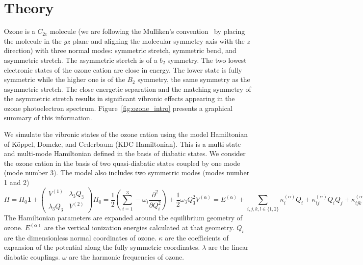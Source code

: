 \documentclass[12pt,a4paper,prb,aps,superscriptaddress]{revtex4}
\begin{document}
\section{Theory}

Ozone is a $C_{2v}$ molecule (we are following the Mulliken's
convention~\cite{Mulliken:55:symnot} by placing the molecule in the $yz$ plane
and aligning the molecular symmetry axis with the $z$ direction) with three
normal modes: symmetric stretch, symmetric bend, and asymmetric stretch.  The
asymmetric stretch is of a $b_2$ symmetry. The two lowest electronic states of
the ozone cation are close in energy. The lower state is fully symmetric while
the higher one is of the $B_2$ symmetry, the same symmetry as the asymmetric
stretch. The close energetic separation and the matching symmetry of the
asymmetric stretch results in significant vibronic effects appearing in the
ozone photoelectron spectrum.  Figure~\ref{fig:ozone_intro} presents a
graphical summary of this information.

We simulate the vibronic states of the ozone cation using the model
Hamiltonian of K{\"o}ppel, Domcke, and Cederbaum (KDC
Hamiltonian).\cite{Cederbaum:LVC:84,KDC:81,Koppel:CIbookCh7:04} This is a
multi-state and multi-mode Hamiltonian defined in the basis of diabatic
states.  We consider the ozone cation in the basis of two quasi-diabatic
states coupled by one mode (mode number 3). The model also includes two
symmetric modes (modes number 1 and 2)
\begin{subequations}
    \begin{equation}
        H = H _0 \mathbf{1}
        +
        \begin{pmatrix}
            V ^{(1)}  & \lambda _3 Q _3\\
            \lambda _3 Q _3 & V ^{(2)}
        \end{pmatrix}
    \end{equation}
    \begin{equation}
        H _0 = 
        \frac{1}{2} \left(\sum _{i = 1}^3 
        - \omega _i \frac{\partial ^2}{\partial Q _i ^2 }\right)
        + \frac{1}{2}\omega _3 Q _3 ^2
    \end{equation}
    \begin{equation}
        V ^{(\alpha)} = 
        E ^{(\alpha)} 
        + \sum _{i,j,k,l \in \{1,2\}} 
            \kappa ^{(\alpha)} _i Q _i 
            + \kappa ^{(\alpha)} _{ij} Q _i Q _j 
            + \kappa ^{(\alpha)} _{ijk} Q _i Q _j Q _k 
            + \kappa ^{(\alpha)} _{ijkl} Q_i Q _j Q _k Q _l.
    \end{equation}
    \label{eq:KDC}
\end{subequations}
The Hamiltonian parameters are expanded around the equilibrium geometry of
ozone. $E ^{(\alpha)}$ are the vertical ionization energies calculated at that
geometry. $Q_i$ are the dimensionless normal coordinates of ozone. $\kappa$ are
the coefficients of expansion of the potential along the fully symmetric
coordinates. $\lambda$ are the linear diabatic couplings.  $\omega$ are the
harmonic frequencies of ozone.
\end{document}
